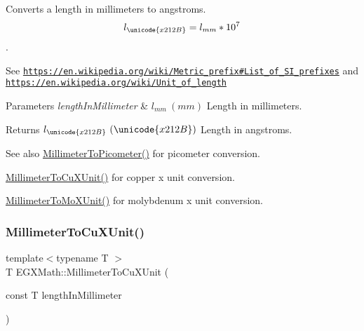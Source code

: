 Converts a length in millimeters to angstroms. \[ l_{\unicode{x212B}}=l_{mm} * 10^{7} \]. 

See \href{https://en.wikipedia.org/wiki/Metric_prefix#List_of_SI_prefixes}{\tt https\+://en.\+wikipedia.\+org/wiki/\+Metric\+\_\+prefix\#\+List\+\_\+of\+\_\+\+S\+I\+\_\+prefixes} and \href{https://en.wikipedia.org/wiki/Unit_of_length}{\tt https\+://en.\+wikipedia.\+org/wiki/\+Unit\+\_\+of\+\_\+length} 
\begin{DoxyParams}{Parameters}
{\em length\+In\+Millimeter} & $ l_{mm}\ (mm)$ Length in millimeters. \\
\hline
\end{DoxyParams}
\begin{DoxyReturn}{Returns}
$ l_{\unicode{x212B}}\ (\unicode{x212B})$ Length in angstroms. 
\end{DoxyReturn}
\begin{DoxySeeAlso}{See also}
\mbox{\hyperlink{group___e_g_x_math-_conversions-_length_conversions-_s_i-_millimeter-_s_i_ga679e3714c229f1355a5c9bf707fcd723}{Millimeter\+To\+Picometer()}} for picometer conversion. 

\mbox{\hyperlink{group___e_g_x_math-_conversions-_length_conversions-_s_i-_millimeter-_non-_s_i_gaa9a94e1f42047955530f673047c4370b}{Millimeter\+To\+Cu\+X\+Unit()}} for copper x unit conversion. 

\mbox{\hyperlink{group___e_g_x_math-_conversions-_length_conversions-_s_i-_millimeter-_non-_s_i_ga1f0be98bc702f46a69579b27e05a2439}{Millimeter\+To\+Mo\+X\+Unit()}} for molybdenum x unit conversion. 
\end{DoxySeeAlso}
\mbox{\label{group___e_g_x_math-_conversions-_length_conversions-_s_i-_millimeter-_non-_s_i_gaa9a94e1f42047955530f673047c4370b}} 
\subsubsection{\texorpdfstring{Millimeter\+To\+Cu\+X\+Unit()}{MillimeterToCuXUnit()}}
{\footnotesize\ttfamily template$<$typename T $>$ \\
T E\+G\+X\+Math\+::\+Millimeter\+To\+Cu\+X\+Unit (\begin{DoxyParamCaption}\item[{const T}]{length\+In\+Millimeter }\end{DoxyParamCaption})}



